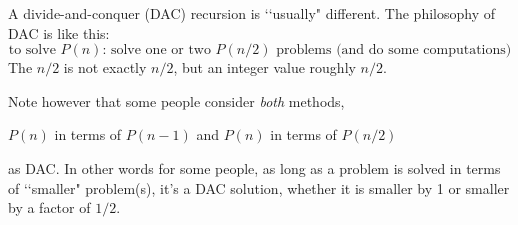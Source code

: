 A divide-and-conquer (DAC) recursion is \lq\lq usually" different.
The philosophy of DAC is like this:
\[
\text{to solve $P(n)$: solve one or two $P(n/2)$ problems (and do some computations)}
\]
The $n/2$ is not exactly $n/2$, but an integer value roughly $n/2$.

Note however that
some people consider \textit{both} methods,
\begin{tightlist}
\li $P(n)$ in terms of $P(n-1)$ and
\li $P(n)$ in terms of $P(n/2)$
\end{tightlist}
as DAC.
In other words for some people, as long as a problem is solved
in terms
of \lq\lq smaller" problem(s), it's a DAC solution,
whether it is smaller by 1 or smaller by a factor of $1/2$.


